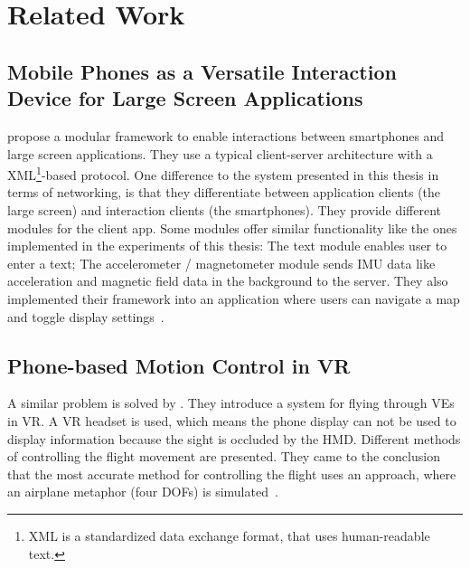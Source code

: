 \chapter{Related Work}\label{chapter:related-work}


\section{Mobile Phones as a Versatile Interaction Device for Large Screen Applications}\label{section:mobile-phones-interaction-device-large-screen}
\citeauthor{Deller.2011} propose a modular framework to enable interactions between smartphones and large screen applications. They use a typical client-server architecture with a XML\footnote{XML is a standardized data exchange format, that uses human-readable text.}-based protocol. One difference to the system presented in this thesis in terms of networking, is that they differentiate between application clients (the large screen) and interaction clients (the smartphones). They provide different modules for the client app. Some modules offer similar functionality like the ones implemented in the experiments of this thesis: The text module enables user to enter a text; The accelerometer / magnetometer module sends \ac{IMU} data like acceleration and magnetic field data in the background to the server. They also implemented their framework into an application where users can navigate a map and toggle display settings~\cite{Deller.2011}.


\section{Phone-based Motion Control in VR}\label{section:phone-based-motion-control-vr}
A similar problem is solved by \citeauthor{Benzina.2011}. They introduce a system for flying through \acp{VE} in \ac{VR}. A \ac{VR} headset is used, which means the phone display can not be used to display information because the sight is occluded by the \ac{HMD}. Different methods of controlling the flight movement are presented. They came to the conclusion that the most accurate method for controlling the flight uses an approach, where an airplane metaphor (four \acp{DOF}) is simulated~\cite{Benzina.2011}.


